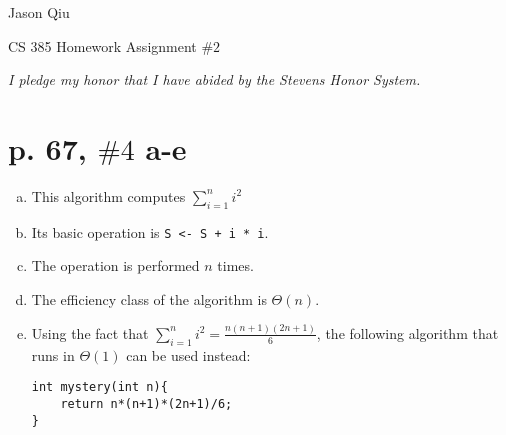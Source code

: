 \documentclass[a4paper,10pt]{article}
\begin{document}
Jason Qiu

CS 385 Homework Assignment $\#2$

\emph{I pledge my honor that I have abided by the Stevens Honor System.}

\section*{p. 67, $\#4$ a-e}
\begin{enumerate}[(a)]
\item This algorithm computes $\sum_{i = 1}^{n}i^2$
\item Its basic operation is \verb|S <- S + i * i|.
\item The operation is performed $n$ times.
\item The efficiency class of the algorithm is $\Theta(n)$.
\item Using the fact that $\sum_{i=1}^{n} i^2 = \frac{n(n+1)(2n+1)}{6}$, the following algorithm that runs in $\Theta(1)$ can be used instead:

\begin{lstlisting}
int mystery(int n){
	return n*(n+1)*(2n+1)/6;
}
\end{lstlisting}
\end{enumerate}
\end{document}
